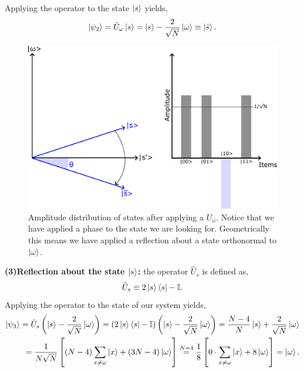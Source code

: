 Applying the operator to the state $\ket{s}$ yields,
\begin{equation}
    \ket{\psi_{2}} = \hat{U}_{\omega}\ket{s} = \ket{s} -\frac{2}{\sqrt{N}}\ket{\omega} \equiv \ket{\bar{s}}.
\end{equation}
\begin{figure}[H]
\centering
    \includegraphics[scale=0.55]{Figures/Grover_Step2.pdf}
    \caption{Amplitude distribution of states after applying a $U_{\omega}$. Notice that we have applied a phase to the state we are looking for. Geometrically this means we have applied a reflection about a state orthonormal to $\ket\omega$.}
    \label{fig:Grover_step2}
\end{figure}
\textbf{(3)Reflection about the state $\ket{s}$:} the operator $\hat{U}_{s}$ is defined as,
\begin{equation}
    \hat{U}_{s} \equiv 2\ket{s}\bra{s} - \mathbb{I}.
\end{equation}
Applying the operator to the state of our system yields,
\begin{align*}
    \ket{\psi_{3}} = \hat{U}_{s}\left(\ket{s} -\frac{2}{\sqrt{N}}\ket{\omega}\right) = \left(2\ket{s}\bra{s} - \mathbb{I}\right)\left(\ket{s} - \frac{2}{\sqrt{N}}\ket{\omega}\right) = \frac{N - 4}{N}\ket{s} + \frac{2}{\sqrt{N}}\ket{\omega} \\
    = \frac{1}{N\sqrt{N}} \left[\left(N - 4\right)\sum_{x\neq \omega}\ket{x} + \left(3N-4\right)\ket{\omega}\right] \overset{N=4}{=} \frac{1}{8} \left[0 \cdot \sum_{x\neq \omega}\ket{x} + 8\ket{\omega}\right] = \ket{\omega}.
\end{align*}

